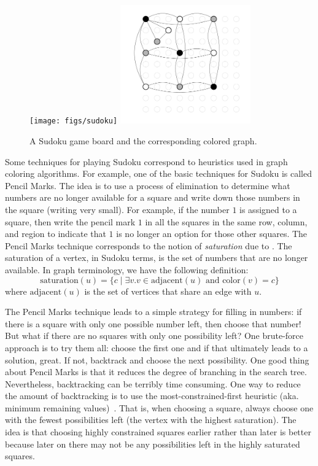 \documentclass[7x10,nocrop]{TimesAPriori_MIT}%
\begin{document}
\begin{figure}[tbp]
\texttt{[image: figs/sudoku]}
\includegraphics[width=0.5\textwidth]{figs/sudoku-graph-bw}
\caption{A Sudoku game board and the corresponding colored graph.}
\label{fig:sudoku-graph}
\end{figure}

Some techniques for playing Sudoku correspond to heuristics used in
graph coloring algorithms.  For example, one of the basic techniques
for Sudoku is called Pencil Marks. The idea is to use a process of
elimination to determine what numbers are no longer available for a
square and write down those numbers in the square (writing very
small). For example, if the number $1$ is assigned to a square, then
write the pencil mark $1$ in all the squares in the same row, column,
and region to indicate that $1$ is no longer an option for those other
squares.
%
The Pencil Marks technique corresponds to the notion of
\emph{saturation} due to \cite{Brelaz:1979eu}.  The
saturation of a vertex, in Sudoku terms, is the set of numbers that
are no longer available. In graph terminology, we have the following
definition:
\begin{equation*}
  \mathrm{saturation}(u) = \{ c \;|\; \exists v. v \in \mathrm{adjacent}(u)
     \text{ and } \mathrm{color}(v) = c \}
\end{equation*}
where $\mathrm{adjacent}(u)$ is the set of vertices that share an
edge with $u$.

The Pencil Marks technique leads to a simple strategy for filling in
numbers: if there is a square with only one possible number left, then
choose that number! But what if there are no squares with only one
possibility left? One brute-force approach is to try them all: choose
the first one and if that ultimately leads to a solution, great.  If
not, backtrack and choose the next possibility.  One good thing about
Pencil Marks is that it reduces the degree of branching in the search
tree. Nevertheless, backtracking can be terribly time consuming. One
way to reduce the amount of backtracking is to use the
most-constrained-first heuristic (aka. minimum remaining
values)~\citep{Russell2003}.  That is, when choosing a square, always
choose one with the fewest possibilities left (the vertex with the
highest saturation).  The idea is that choosing highly constrained
squares earlier rather than later is better because later on there may
not be any possibilities left in the highly saturated squares.
\end{document}
